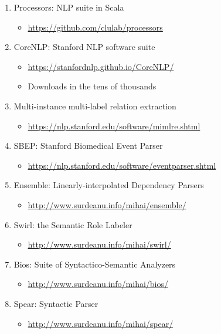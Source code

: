 \documentclass[10pt]{article}
\begin{document}
\begin{description}
\begin{enumerate}
\item Processors: NLP suite in Scala
\begin{itemize}
\item \url{https://github.com/clulab/processors }
\end{itemize}

\item CoreNLP: Stanford NLP software suite
\begin{itemize}
\item \url{https://stanfordnlp.github.io/CoreNLP/}
\item Downloads in the tens of thousands
\end{itemize}

\item Multi-instance multi-label relation extraction
\begin{itemize}
\item \url{https://nlp.stanford.edu/software/mimlre.shtml}
\end{itemize}

\item SBEP: Stanford Biomedical Event Parser 
\begin{itemize}
\item \url{https://nlp.stanford.edu/software/eventparser.shtml}
\end{itemize}

\item Ensemble: Linearly-interpolated Dependency Parsers
\begin{itemize}
\item \url{http://www.surdeanu.info/mihai/ensemble/ }
\end{itemize}

\item Swirl: the Semantic Role Labeler
\begin{itemize}
\item \url{http://www.surdeanu.info/mihai/swirl/}
\end{itemize}

\item Bios: Suite of Syntactico-Semantic Analyzers
\begin{itemize}
\item \url{http://www.surdeanu.info/mihai/bios/ }
\end{itemize}

\item Spear: Syntactic Parser
\begin{itemize}
\item \url{http://www.surdeanu.info/mihai/spear/ }
\end{itemize}


\end{enumerate}
\end{description}
\end{document}
